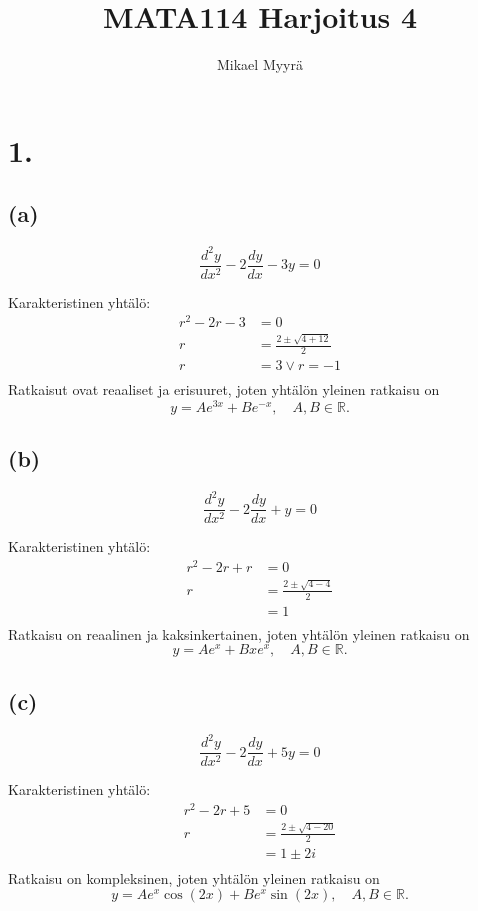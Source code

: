 \documentclass{article}
\title{MATA114 Harjoitus 4}
\author{Mikael Myyrä}
\date{}
\begin{document}
\maketitle

\section*{1.}

\subsection*{(a)}

\[
  \frac{d^2 y}{d x^2} - 2\frac{dy}{dx} - 3y = 0
\]

Karakteristinen yhtälö:
\begin{align*}
  r^2 - 2r - 3 &= 0 \\
  r &= \frac{2 \pm \sqrt{4 + 12}}{2} \\
  r &= 3 \vee r = -1 \\
\end{align*}
Ratkaisut ovat reaaliset ja erisuuret, joten yhtälön yleinen ratkaisu on
\[
  y = Ae^{3x} + Be^{-x}, \quad A, B \in \mathbb{R}.
\]

\subsection*{(b)}

\[
  \frac{d^2 y}{d x^2} - 2\frac{dy}{dx} + y = 0
\]

Karakteristinen yhtälö:
\begin{align*}
  r^2 - 2r + r &= 0 \\
  r &= \frac{2 \pm \sqrt{4 - 4}}{2} \\
    &= 1 \\
\end{align*}
Ratkaisu on reaalinen ja kaksinkertainen, joten yhtälön yleinen ratkaisu on
\[
  y = Ae^x + Bxe^x, \quad A, B \in \mathbb{R}.
\]

\subsection*{(c)}

\[
  \frac{d^2 y}{d x^2} - 2\frac{dy}{dx} + 5y = 0
\]

Karakteristinen yhtälö:
\begin{align*}
  r^2 - 2r + 5 &= 0 \\
  r &= \frac{2 \pm \sqrt{4 - 20}}{2} \\
    &= 1 \pm 2i \\
\end{align*}
Ratkaisu on kompleksinen, joten yhtälön yleinen ratkaisu on
\[
  y = Ae^x\cos(2x) + Be^x\sin(2x), \quad A, B \in \mathbb{R}.
\]
\end{document}
